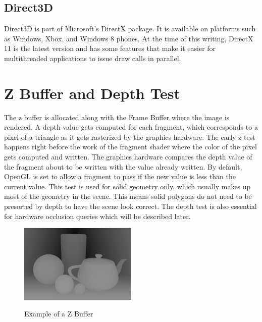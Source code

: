 \documentclass[12pt]{ucthesis}
\newcommand{\captionfonts}{\small\bf\ssp}
\begin{document}
\subsection{Direct3D}
\label{direct3d}

Direct3D is part of Microsoft's DirectX package.\cite{about-direct3D}
It is available on platforms such as Windows, Xbox, and Windows 8 phones.
At the time of this writing, DirectX 11 is the latest version and has some features that make it easier for multithreaded applications to issue draw calls in parallel.\cite{d3d11-parallel}

\section{Z Buffer and Depth Test}
\label{z-buffer-and-depth-test}

The z buffer is allocated along with the Frame Buffer where the image is rendered.
A depth value gets computed for each fragment, which corresponds to a pixel of a triangle as it gets rasterized by the graphics hardware.
The early z test happens right before the work of the fragment shader where the color of the pixel gets computed and written.\cite{d3d11-pipeline}
The graphics hardware compares the depth value of the fragment about to be written with the value already written.
By default, OpenGL is set to allow a fragment to pass if the new value is less than the current value.\cite{gl-depth-func}
This test is used for solid geometry only, which usually makes up most of the geometry in the scene.
This means solid polygons do not need to be presorted by depth to have the scene look correct.
The depth test is also essential for hardware occlusion queries which will be described later.

\begin{figure}
\begin{center}
\includegraphics[width=0.5\textwidth]{Images/Z_buffer.png}
\captionfonts
\caption[Z Buffer]{Example of a Z Buffer}
\label{fig:z-buffer}
\end{center}
\end{figure}
\end{document}
